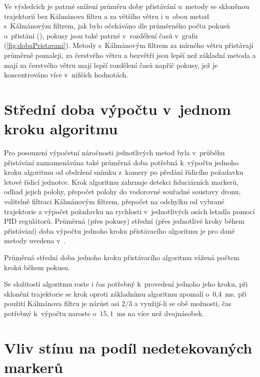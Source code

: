     Ve výsledcích je patrné snížení průměru doby přistávání u~metody se skloněnou trajektorií bez Kálmánova filtru a za většího větru i u~obou metod s~Kálmánovým filtrem, jak bylo očekáváno dle průměrného počtu pokusů o~přistání (), pokusy jsou také patrné v~rozdělení časů v~grafu (\cref{fig:dobaPristavani}). Metody s~Kálmánovým filtrem za mírného větru přistávají průměrně pomaleji, za čerstvého větru a bezvětří jsou lepší než základní metoda a mají za čerstvého větru mají lepší rozdělení časů napříč pokusy, jež je koncentrováno více v~nižších hodnotách.
    

  \section{Střední doba výpočtu v~jednom kroku algoritmu} \label{sec:stredniDobaVypoctu}
    Pro posouzení výpočetní náročnosti jednotlivých metod byla v~průběhu přistávání zaznamenávána také průměrná doba potřebná k~výpočtu jednoho kroku algoritmu od obdržení snímku z~kamery po předání řídicího požadavku letové řídicí jednotce. Krok algoritmu zahrnuje detekci fiduciárních markerů, odhad jejich polohy, přepočet polohy do vodorovné souřadné soustavy dronu, volitelně filtraci Kálmánovým filtrem, přepočet na odchylku od vybrané trajektorie a výpočet požadavku na rychlosti v~jednotlivých osách letadla pomocí PID regulátorů. Průměrná (přes pokusy) střední (přes jednotlivé kroky během přistávání) doba výpočtu jednoho kroku přistávacího algoritmu je pro dané metody uvedena v~.

    \begin{table}
      \centering
      
      \caption[Průměrná střední doba jednoho kroku algoritmu]{Průměrná střední doba jednoho kroku přistávacího algoritmu vážená počtem kroků během pokusu.}
      \label{tab:dobaKroku}
    \end{table}

    Se složitostí algoritmu roste i čas potřebný k~provedení jednoho jeho kroku, při sklonění trajektorie se krok oproti základnímu algoritmu zpomalí o~0{,}4~ms, při použití Kálmánova filtru je nárůst asi $2/3$ a využijí-li se obě možnosti, čas potřebný k~výpočtu naroste o~$15{,}1$~ms na více než dvojnásobek.
  \section{Vliv stínu na podíl nedetekovaných markerů} \label{sec:stin}
    
